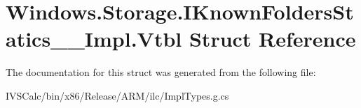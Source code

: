\hypertarget{struct_windows_1_1_storage_1_1_i_known_folders_statics_____impl_1_1_vtbl}{}\section{Windows.\+Storage.\+I\+Known\+Folders\+Statics\+\_\+\+\_\+\+Impl.\+Vtbl Struct Reference}
\label{struct_windows_1_1_storage_1_1_i_known_folders_statics_____impl_1_1_vtbl}


The documentation for this struct was generated from the following file\+:\begin{DoxyCompactItemize}
\item 
I\+V\+S\+Calc/bin/x86/\+Release/\+A\+R\+M/ilc/Impl\+Types.\+g.\+cs\end{DoxyCompactItemize}
